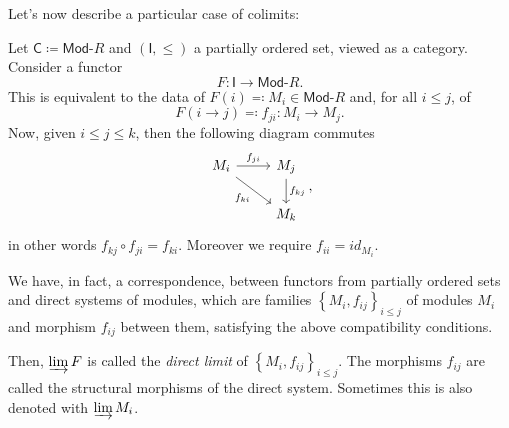 Let's now describe a particular case of colimits:
\begin{ex}
	Let $\mathsf{C} \coloneqq \mathsf{Mod}\text{-}R$ and $\left( \mathsf{I}, \leq \right)$ a partially ordered set, viewed as a category.
	Consider a functor
	\begin{equation}
	F\colon \mathsf{I} \to \mathsf{Mod}\text{-}R
	.\end{equation} 
	This is equivalent to the data of $F(i) \eqqcolon M_i \in \mathsf{Mod}\text{-}R$ and, for all $i \leq j$, of
	\begin{equation}
		F(i \to j) \eqqcolon f_{ji}\colon M_i \to M_j
	.\end{equation} 
	Now, given $i \leq j \leq k$, then the following diagram commutes
	\begin{equation}
	\begin{tikzcd}
		M_i \arrow[r, "f_{ji}", rightarrow] \arrow[rd, "f_{ki}"', rightarrow] &
		M_j \arrow[d, "f_{kj}", rightarrow] \\
		&
		M_k
	\end{tikzcd}
	,\end{equation} 
	in other words $f_{kj} \circ f_{ji} = f_{ki}$. Moreover we require $f_{ii} = id_{M_i}$.

	We have, in fact, a correspondence, between functors from partially ordered sets and
	direct systems of modules, which are families $\left\{ M_i, f_{ij} \right\}_{i \leq j}$ of modules $M_i$ and morphism $f_{ij}$ between them, satisfying the above compatibility conditions.

	Then, $\varinjlim F$ is called the {\em direct limit} of $\left\{ M_i, f_{ij} \right\}_{i \leq j}$.
	The morphisms $f_{ij}$ are called the structural morphisms of the direct system.
	Sometimes this is also denoted with $\varinjlim M_i$.
	

\end{ex}
